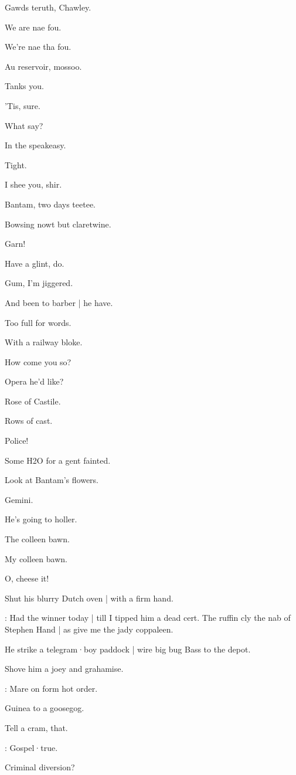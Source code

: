 Gawds teruth,
Chawley.

We are nae fou.

We're nae tha fou.

Au reservoir,
mossoo.

Tanks you.


'Tis,
sure.

What say?

In the speakeasy.

Tight.

I shee you,
shir.

Bantam,
two days teetee.

Bowsing nowt but claretwine.

Garn!

Have a glint,
do.

Gum,
I'm jiggered.

And been to barber |
he have.

Too full for words.

With a railway bloke.

How come you so?

Opera he'd like?

Rose of Castile.

Rows of cast.

Police!

Some H2O for a gent fainted.

Look at Bantam's flowers.

Gemini.

He's going to holler.

The colleen bawn.

My colleen bawn.

O,
cheese it!

Shut his blurry Dutch oven |
with a firm hand.

\lenehan:
Had the winner today |
till I tipped him a dead cert.
The ruffin cly the nab of Stephen Hand |
as give me the jady coppaleen.

He strike a telegram·boy paddock |
wire big bug Bass to the depot.

Shove him a joey and grahamise.

\lenehan:
Mare on form hot order.

Guinea to a goosegog.

Tell a cram,
that.

\lenehan:
Gospel·true.

Criminal diversion?

